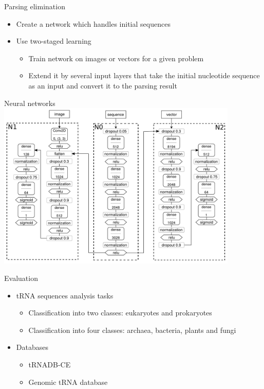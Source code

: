 \documentclass[xcolor=table]{beamer}
\begin{document}
\begin{frame}{Parsing elimination}
    \begin{itemize}
        \item Create a network which handles initial sequences
        \item Use two-staged learning
        \begin{itemize}
            \item Train network on images or vectors for a given problem
            \item Extend it by several input layers that take the initial nucleotide sequence as an input and convert it to the parsing result 
        \end{itemize}
    \end{itemize}
\end{frame}

\begin{frame}{Neural networks}
\includegraphics[width=11.5cm]{pictures/nn_arch.pdf}
\end{frame}


\begin{frame}{Evaluation}
\begin{itemize}
    \item tRNA sequences analysis tasks
    \begin{itemize}
        \item Classification into two classes: eukaryotes and prokaryotes
        \item Classification into four classes: archaea, bacteria, plants and fungi
    \end{itemize}
    \item Databases
    \begin{itemize}
        \item tRNADB-CE
        \item Genomic tRNA database
    \end{itemize}
\end{itemize}
\end{frame}
\end{document}
